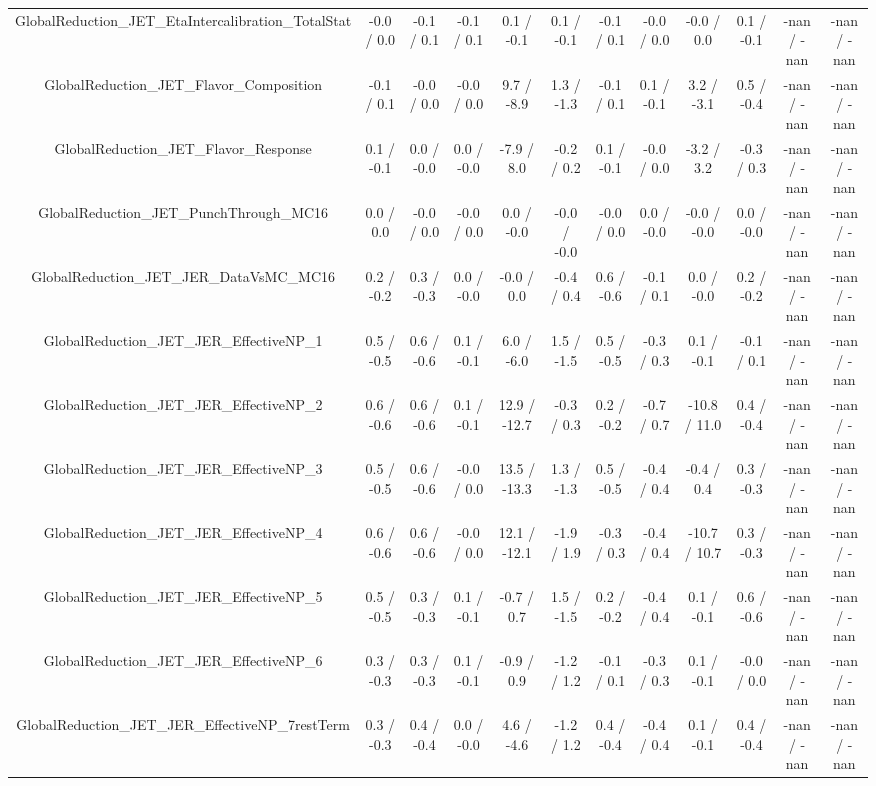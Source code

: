 \begin{table}[htbp]
\begin{center}
\begin{tabular}{|c|c|c|c|c|c|c|c|c|c|c|c|}
  GlobalReduction_JET_EtaIntercalibration_TotalStat & -0.0 / 0.0 & -0.1 / 0.1 & -0.1 / 0.1 & 0.1 / -0.1 & 0.1 / -0.1 & -0.1 / 0.1 & -0.0 / 0.0 & -0.0 / 0.0 & 0.1 / -0.1 & -nan / -nan & -nan / -nan \\ 
  GlobalReduction_JET_Flavor_Composition & -0.1 / 0.1 & -0.0 / 0.0 & -0.0 / 0.0 & 9.7 / -8.9 & 1.3 / -1.3 & -0.1 / 0.1 & 0.1 / -0.1 & 3.2 / -3.1 & 0.5 / -0.4 & -nan / -nan & -nan / -nan \\ 
  GlobalReduction_JET_Flavor_Response & 0.1 / -0.1 & 0.0 / -0.0 & 0.0 / -0.0 & -7.9 / 8.0 & -0.2 / 0.2 & 0.1 / -0.1 & -0.0 / 0.0 & -3.2 / 3.2 & -0.3 / 0.3 & -nan / -nan & -nan / -nan \\ 
  GlobalReduction_JET_PunchThrough_MC16 & 0.0 / 0.0 & -0.0 / 0.0 & -0.0 / 0.0 & 0.0 / -0.0 & -0.0 / -0.0 & -0.0 / 0.0 & 0.0 / -0.0 & -0.0 / -0.0 & 0.0 / -0.0 & -nan / -nan & -nan / -nan \\ 
  GlobalReduction_JET_JER_DataVsMC_MC16 & 0.2 / -0.2 & 0.3 / -0.3 & 0.0 / -0.0 & -0.0 / 0.0 & -0.4 / 0.4 & 0.6 / -0.6 & -0.1 / 0.1 & 0.0 / -0.0 & 0.2 / -0.2 & -nan / -nan & -nan / -nan \\ 
  GlobalReduction_JET_JER_EffectiveNP_1 & 0.5 / -0.5 & 0.6 / -0.6 & 0.1 / -0.1 & 6.0 / -6.0 & 1.5 / -1.5 & 0.5 / -0.5 & -0.3 / 0.3 & 0.1 / -0.1 & -0.1 / 0.1 & -nan / -nan & -nan / -nan \\ 
  GlobalReduction_JET_JER_EffectiveNP_2 & 0.6 / -0.6 & 0.6 / -0.6 & 0.1 / -0.1 & 12.9 / -12.7 & -0.3 / 0.3 & 0.2 / -0.2 & -0.7 / 0.7 & -10.8 / 11.0 & 0.4 / -0.4 & -nan / -nan & -nan / -nan \\ 
  GlobalReduction_JET_JER_EffectiveNP_3 & 0.5 / -0.5 & 0.6 / -0.6 & -0.0 / 0.0 & 13.5 / -13.3 & 1.3 / -1.3 & 0.5 / -0.5 & -0.4 / 0.4 & -0.4 / 0.4 & 0.3 / -0.3 & -nan / -nan & -nan / -nan \\ 
  GlobalReduction_JET_JER_EffectiveNP_4 & 0.6 / -0.6 & 0.6 / -0.6 & -0.0 / 0.0 & 12.1 / -12.1 & -1.9 / 1.9 & -0.3 / 0.3 & -0.4 / 0.4 & -10.7 / 10.7 & 0.3 / -0.3 & -nan / -nan & -nan / -nan \\ 
  GlobalReduction_JET_JER_EffectiveNP_5 & 0.5 / -0.5 & 0.3 / -0.3 & 0.1 / -0.1 & -0.7 / 0.7 & 1.5 / -1.5 & 0.2 / -0.2 & -0.4 / 0.4 & 0.1 / -0.1 & 0.6 / -0.6 & -nan / -nan & -nan / -nan \\ 
  GlobalReduction_JET_JER_EffectiveNP_6 & 0.3 / -0.3 & 0.3 / -0.3 & 0.1 / -0.1 & -0.9 / 0.9 & -1.2 / 1.2 & -0.1 / 0.1 & -0.3 / 0.3 & 0.1 / -0.1 & -0.0 / 0.0 & -nan / -nan & -nan / -nan \\ 
  GlobalReduction_JET_JER_EffectiveNP_7restTerm & 0.3 / -0.3 & 0.4 / -0.4 & 0.0 / -0.0 & 4.6 / -4.6 & -1.2 / 1.2 & 0.4 / -0.4 & -0.4 / 0.4 & 0.1 / -0.1 & 0.4 / -0.4 & -nan / -nan & -nan / -nan \\ 

\end{tabular}
\end{center}
\end{table}
